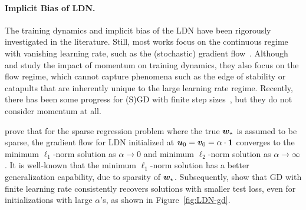 \paragraph{Implicit Bias of LDN.} The training dynamics and implicit bias of the LDN have been rigorously investigated in the literature. Still, most works focus on the continuous regime with vanishing learning rate, such as the (stochastic) gradient flow~\citep{woodworth2020kernel,azulay2021initialization,moroshko2020initialization,pesme2023hopping,pesme2021sgd}.
Although \cite{papazov2024momentum} and \cite{lyu2024momentum} study the impact of momentum on training dynamics, they also focus on the flow regime, which cannot capture phenomena such as the edge of stability or catapults that are inherently unique to the large learning rate regime.
Recently, there has been some progress for (S)GD with finite step sizes~\citep{nacson2022stepsize,even2023diagonal}, but they do not consider momentum at all.

\citet{woodworth2020kernel} prove that for the sparse regression problem where the true ${\bm{w}}_\star$ is assumed to be sparse, the gradient flow for LDN initialized at ${\bm{u}}_0 = {\bm{v}}_0 = \alpha\cdot\bm{1}$ converges to the minimum $\ell_1$-norm solution as $\alpha \rightarrow 0$ and minimum $\ell_2$-norm solution as $\alpha \rightarrow \infty$.
It is well-known that the minimum $\ell_1$-norm solution has a better generalization capability, due to sparsity of ${\bm{w}}_\star$.
Subsequently, \cite{nacson2022stepsize} show that GD with finite learning rate consistently recovers solutions with smaller test loss, even for initializations with large $\alpha$'s, as shown in Figure~\ref{fig:LDN-gd}.

\vspace{-5pt}

